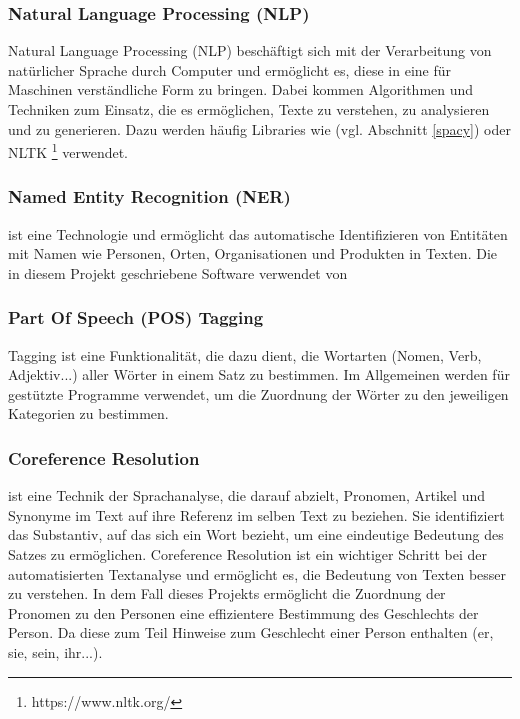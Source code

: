 \subsubsection{Natural Language Processing (NLP)}

Natural Language Processing (NLP) beschäftigt sich mit der Verarbeitung
von natürlicher Sprache durch Computer und ermöglicht es, diese in eine
für Maschinen verständliche Form zu bringen. Dabei kommen
Algorithmen und Techniken zum Einsatz, die es ermöglichen, Texte zu
verstehen, zu analysieren und zu generieren. Dazu werden häufig Libraries
wie  (vgl. Abschnitt \ref{spacy}) oder NLTK \footnote{https://www.nltk.org/} verwendet.

\subsubsection{Named Entity Recognition (NER)}

 ist eine  Technologie und ermöglicht
das automatische Identifizieren von Entitäten mit Namen wie Personen,
Orten, Organisationen und Produkten in Texten. Die in diesem Projekt
geschriebene Software verwendet  von 

\subsubsection{Part Of Speech (POS) Tagging}

 Tagging ist eine  Funktionalität, die dazu dient, die Wortarten
(Nomen, Verb, Adjektiv...) aller Wörter in einem Satz zu bestimmen.
Im Allgemeinen werden für   gestützte Programme verwendet,
um die Zuordnung der Wörter zu den jeweiligen Kategorien zu bestimmen.

\subsubsection{Coreference Resolution}

 ist eine Technik der Sprachanalyse, die darauf abzielt, Pronomen, Artikel und Synonyme im Text
auf ihre Referenz im selben Text zu beziehen. Sie identifiziert das Substantiv, auf das
sich ein Wort bezieht, um eine eindeutige Bedeutung des Satzes
zu ermöglichen. Coreference Resolution ist ein wichtiger Schritt bei der 
automatisierten Textanalyse und ermöglicht es, die Bedeutung von Texten besser zu 
verstehen. In dem Fall dieses Projekts ermöglicht die Zuordnung der Pronomen zu
den Personen eine effizientere Bestimmung des Geschlechts der Person. Da diese
zum Teil Hinweise zum Geschlecht einer Person enthalten (er, sie, sein, ihr...).

